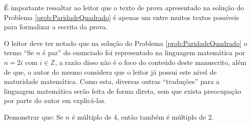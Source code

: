 \begin{remark}
    É importante ressaltar ao leitor que o texto de prova apresentado na solução do Problema \ref{prob:ParidadeQuadrado} é apenas um entre muitos textos possíveis para formalizar a escrita da prova.
\end{remark}

\begin{note}
    O leitor deve ter notado que na solução do Problema \ref{prob:ParidadeQuadrado} o termo ``Se $n$ é par'' do enunciado foi representado na linguagem matemática por $n = 2i \text{ com } i \in \mathbb{Z}$, a razão disso não é o foco do conteúdo deste manuscrito, além de que, o autor do mesmo considera que o leitor já possui este nível de maturidade matemática. Como esta, diversas outras ``traduções'' para a linguagem matemática serão feita de forma direta, sem que exista preocupação por parte do autor em explicá-las.
\end{note}

\begin{problem}\label{prob:MultiploDe4e2}
    Demonstrar que: Se $n$ é múltiplo de 4, então também é múltiplo de 2.
\end{problem}

